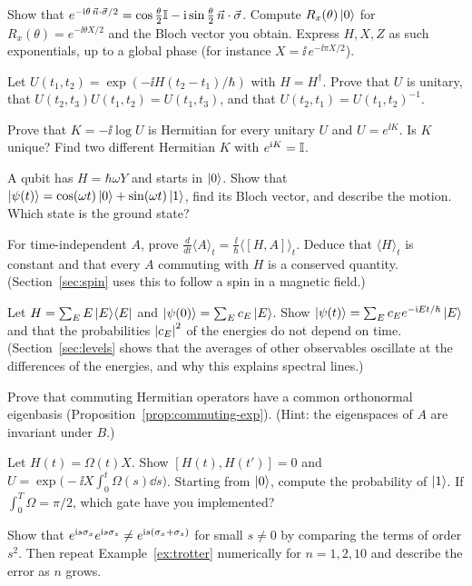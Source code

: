 \begin{exerciseset}
   Show that $e^{-\mathrm{i}\theta\,\vec n\cdot\vec\sigma/2}=\cos\frac\theta2\mathbb{I}-\mathrm{i}\sin\frac\theta2\,\vec n\cdot\vec\sigma$. Compute $R_x(\theta)\left|0\right\rangle$ for $R_x(\theta)=e^{-\ii\theta X/2}$ and the Bloch vector you obtain. Express $H,X,Z$ as such exponentials, up to a global phase (for instance $X=\ii\,e^{-\ii\pi X/2}$).\label{ex:rotation-formula}

   Let $U(t_1,t_2)=\exp(-\ii H(t_2-t_1)/\hbar)$ with $H=H^\dagger$. Prove that $U$ is unitary, that $U(t_2,t_3)U(t_1,t_2)=U(t_1,t_3)$, and that $U(t_2,t_1)=U(t_1,t_2)^{-1}$.

   Prove that $K=-\ii\log U$ is Hermitian for every unitary $U$ and $U=e^{\ii K}$. Is $K$ unique? Find two different Hermitian $K$ with $e^{\mathrm{i} K}=\mathbb{I}$.

   A qubit has $H=\hbar\omega Y$ and starts in $\left|0\right\rangle$. Show that $\left|\psi(t)\right\rangle=\cos(\omega t)\left|0\right\rangle+\sin(\omega t)\left|1\right\rangle$, find its Bloch vector, and describe the motion. Which state is the ground state?

   For time-independent $A$, prove $\frac{d}{dt}\langle A\rangle_t=\frac{\ii}{\hbar}\langle[H,A]\rangle_t$. Deduce that $\langle H\rangle_t$ is constant and that every $A$ commuting with $H$ is a conserved quantity. (Section~\ref{sec:spin} uses this to follow a spin in a magnetic field.)

   Let $H=\sum_EE\left|E\right\rangle\!\left\langle E\right|$ and $\left|\psi(0)\right\rangle=\sum_Ec_E\left|E\right\rangle$. Show $\left|\psi(t)\right\rangle=\sum_Ec_Ee^{-\mathrm{i} Et/\hbar}\left|E\right\rangle$ and that the probabilities $\left|c_E\right|^2$ of the energies do not depend on time. (Section~\ref{sec:levels} shows that the averages of other observables oscillate at the differences of the energies, and why this explains spectral lines.)

   Prove that commuting Hermitian operators have a common orthonormal eigenbasis (Proposition~\ref{prop:commuting-exp}). (Hint: the eigenspaces of $A$ are invariant under $B$.)\label{ex:commuting-basis}

   Let $H(t)=\Omega(t)X$. Show $[H(t),H(t')]=0$ and $U=\exp\bigl(-\ii X\int_0^t\Omega(s)\dd s\bigr)$. Starting from $\left|0\right\rangle$, compute the probability of $\left|1\right\rangle$. If $\int_0^T\Omega=\pi/2$, which gate have you implemented?

   Show that $e^{\mathrm{i} s\sigma_x}e^{\mathrm{i} s\sigma_z}\neq e^{\mathrm{i} s(\sigma_x+\sigma_z)}$ for small $s\neq0$ by comparing the terms of order $s^2$. Then repeat Example~\ref{ex:trotter} numerically for $n=1,2,10$ and describe the error as $n$ grows.\label{ex:trotter-exercise}


\end{exerciseset}
